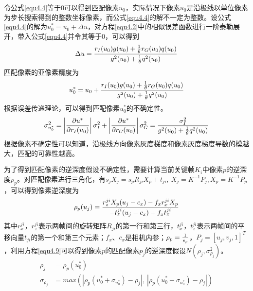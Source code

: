 令公式\eqref{equ4.4}等于$0$可以得到匹配像素$u_0$，实际情况下像素$u_0$是沿极线以单位像素为步长搜索得到的整数坐标像素，而公式\eqref{equ4.4}的解不一定为整数。设公式\eqref{equ4.4}的解为$u_0^*=u_0+\Delta u$，对方程\eqref{equ4.2}中的相似误差函数进行一阶泰勒展开，带入公式\eqref{equ4.4}并令其等于$0$，可以得到
\begin{equation}
\label{equ4.6}
\Delta u = {{ r_I(u_0) g(u_0)+ {1 \over \theta} r_G(u_0)q(u_0) } \over {g^2(u_0)+ { 1 \over \theta} q^2(u_0)}}
\end{equation}
匹配像素的亚像素精度为
\begin{equation}
\label{equ4.7}
u_0^* = u_0 + {{ r_I(u_0) g(u_0)+ {1 \over \theta} r_G(u_0)q(u_0) } \over {g^2(u_0)+ { 1 \over \theta} q^2(u_0)}}
\end{equation}
根据误差传递理论，可以得到匹配像素$u_0^*$的不确定性。
\begin{equation}
\label{equ4.8}
\sigma_{u_0^*}^2 = \left \vert { \partial u^* \over \partial r_I(u_0) }  \right \vert \sigma_I^2 + \left \vert { \partial u^* \over \partial r_G(u_0) }  \right \vert \sigma_G^2 = { \sigma_I^2 \over g^2(u_0) + {1 \over \theta} q^2(u_0) }
\end{equation}
根据像素不确定性可以知道，沿极线方向像素灰度梯度和像素灰度梯度导数的模越大，匹配的可靠性越高。

为了得到匹配像素的逆深度假设不确定性，需要计算当前关键帧$K_i$中像素$p$的逆深度$\rho_p$。对匹配像素进行三角化，有$s_jX_j = s_pR_{ji}X_p+t_{ji}, \  X_j = K^{-1}P_j, X_p = K^{-1}P_p$，可以得到像素逆深度为
\begin{equation}
\label{equ4.9}
\rho_p(u_j) = { r_z^{ji} X_p (u_j-c_x) - f_x r_x^{ji} X_p  \over - t_z^{ji}(u_j-c_x)+f_x t_x^{ji} }
\end{equation}
其中$r_x^{ji}$，$r_z^{ji}$表示两帧间的旋转矩阵$R_{ji}$的第一行和第三行，$t_x^{ji}$，$t_z^{ji}$表示两帧间的平移向量$t_{ji}$的第一个和第三个元素；$f_x$、$c_x$是相机内参；$\rho_p = { 1 \over s_p}$，$P_j= \left [ u_j, v_j, 1 \right ] ^T$，利用方程\eqref{equ4.9}可以得到像素$p$的匹配像素$p_j$的逆深度假设$N(\rho_j, \sigma_{\rho_j}^2)$。
\begin{equation}
\label{equ4.10}
\begin{aligned}
 \rho_j &= \rho_p(u_0^*) \\ 
 \sigma_{\rho_j} &= max \left( \left \vert  \rho_p(u_0^*+\sigma_{u_0^*})-\rho_j \right \vert , \  \left \vert  \rho_p(u_0^*-\sigma_{u_0^*})-\rho_j \right \vert \right)
\end{aligned}
\end{equation}

